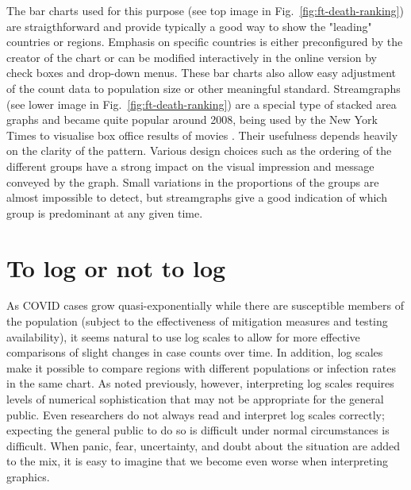 \documentclass[article]{jdssv}\usepackage[]{graphicx}\usepackage[]{color}
\begin{document}
The bar charts used for this purpose (see top image in Fig.~\ref{fig:ft-death-ranking}) are straigthforward and provide typically a good way to show the "leading" countries or regions. Emphasis on specific countries is either preconfigured by the creator of the chart or can be modified interactively in the online version by check boxes and drop-down menus. These bar charts also allow easy adjustment of the count data to population size or other meaningful standard. Streamgraphs (see lower image in Fig.~\ref{fig:ft-death-ranking}) are a special type of stacked area graphs and became quite popular around 2008, being used by the New York Times to visualise box office results of movies \citep{streamgraph}. Their usefulness depends heavily on the clarity of the pattern. Various design choices such as the ordering of the different groups have a strong impact on the visual impression and message conveyed by the graph. Small variations in the proportions of the groups are almost impossible to detect, but streamgraphs give a good indication of which group is predominant at any given time. 



\section{To log or not to log}
As COVID cases grow quasi-exponentially while there are susceptible members of the population (subject to the effectiveness of mitigation measures and testing availability), it seems natural to use log scales to allow for more effective comparisons of slight changes in case counts over time. In addition, log scales make it possible to compare regions with different populations or infection rates in the same chart. As noted previously, however, interpreting log scales requires levels of numerical sophistication that may not be appropriate for the general public. Even researchers do not always read and interpret log scales correctly\citep{mengeLogarithmicScalesEcological2018}; expecting the general public to do so is difficult under normal circumstances\citep{hecklerStudentAccuracyReading2013} is difficult. When panic, fear, uncertainty, and doubt about the situation are added to the mix, it is easy to imagine that we become even worse when interpreting graphics.
\end{document}
